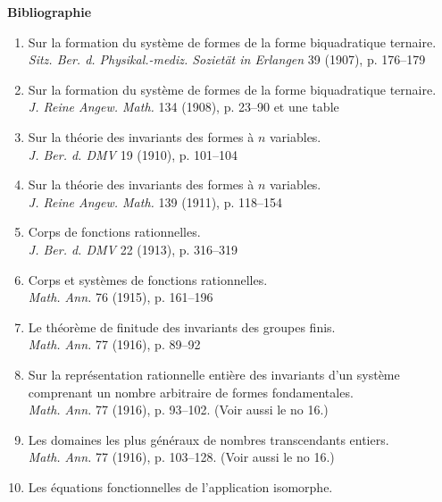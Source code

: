 
\clearpage
\begin{center}
{\Large\bfseries Bibliographie}
\end{center}
\label{fr-r823-bibliographie}

\begin{enumerate}
\setlength{\itemsep}{0.35em}
\item Sur la formation du système de formes de la forme biquadratique ternaire.\\
\emph{Sitz. Ber. d. Physikal.-mediz. Sozietät in Erlangen} 39 (1907), p. 176--179
\item Sur la formation du système de formes de la forme biquadratique ternaire.\\
\emph{J. Reine Angew. Math.} 134 (1908), p. 23--90 et une table
\item Sur la théorie des invariants des formes à $n$ variables.\\
\emph{J. Ber. d. DMV} 19 (1910), p. 101--104
\item Sur la théorie des invariants des formes à $n$ variables.\\
\emph{J. Reine Angew. Math.} 139 (1911), p. 118--154
\item Corps de fonctions rationnelles.\\
\emph{J. Ber. d. DMV} 22 (1913), p. 316--319
\item Corps et systèmes de fonctions rationnelles.\\
\emph{Math. Ann.} 76 (1915), p. 161--196
\item Le théorème de finitude des invariants des groupes finis.\\
\emph{Math. Ann.} 77 (1916), p. 89--92
\item Sur la représentation rationnelle entière des invariants d'un système comprenant un nombre arbitraire de formes fondamentales.\\
\emph{Math. Ann.} 77 (1916), p. 93--102. (Voir aussi le no 16.)
\item Les domaines les plus généraux de nombres transcendants entiers.\\
\emph{Math. Ann.} 77 (1916), p. 103--128. (Voir aussi le no 16.)
\item Les équations fonctionnelles de l'application isomorphe.\\

\end{enumerate}
